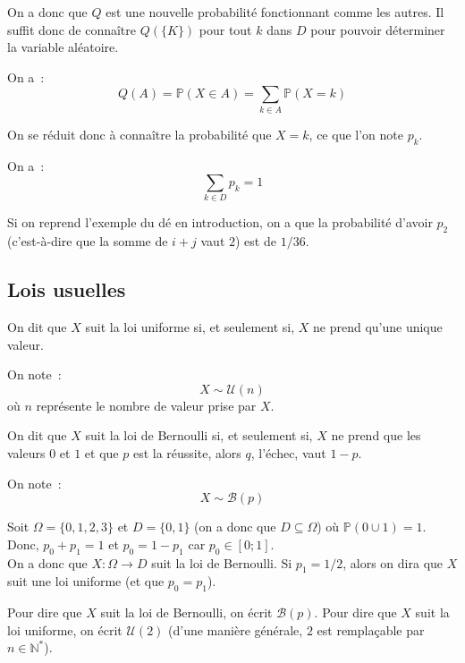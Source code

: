 \documentclass[a4paper, titlepage]{article}
\begin{document}
	On a donc que $Q$ est une nouvelle probabilité fonctionnant comme les autres.
	Il suffit donc de connaître $Q(\{K\})$ pour tout $k$ dans $D$ pour pouvoir déterminer la variable aléatoire.

	\begin{props}
		On a~:
		$$ Q(A) = \mathbb{P}(X\in A) = \sum_{k\in A} \mathbb{P}(X=k) $$
	\end{props}
	On se réduit donc à connaître la probabilité que $X=k$, ce que l'on note $p_k$.

	On a~:
	$$ \sum_{k\in D} p_k = 1 $$

	\begin{exemple}
		Si on reprend l'exemple du dé en introduction, on a que la probabilité d'avoir $p_2$ (c'est-à-dire que la somme de $i+j$ vaut $2$) est de $1/36$.
	\end{exemple}

	\subsection{Lois usuelles}
	\begin{defn}
		On dit que $X$ suit la loi uniforme si, et seulement si, $X$ ne prend qu'une unique valeur.

		On note~:
		$$ X\sim\mathcal{U}(n) $$
		où $n$ représente le nombre de valeur prise par $X$.
	\end{defn}

	\begin{defn}
		On dit que $X$ suit la loi de Bernoulli si, et seulement si, $X$ ne prend que les valeurs $0$ et $1$ et que $p$ est la réussite, alors $q$, l'échec, vaut $1-p$.

		On note~:
		$$ X\sim\mathcal{B}(p) $$
	\end{defn}

	\begin{exemple}
		Soit $\Omega = \{0, 1, 2, 3\}$ et $D = \{0, 1\}$ (on a donc que $D\subseteq \Omega$) où $\mathbb{P}(0\cup 1) = 1$.\\
		Donc, $p_0+p_1 = 1$ et $p_0 = 1- p_1$ car $p_0\in[0;1]$.\\
		On a donc que $X:\Omega \to D$ suit la loi de Bernoulli. Si $p_1 = 1/2$, alors on dira que $X$ suit une loi uniforme (et que $p_0 = p_1$).
	\end{exemple}
	Pour dire que $X$ suit la loi de Bernoulli, on écrit $\mathcal{B}(p)$.
	Pour dire que $X$ suit la loi uniforme, on écrit $\mathcal{U}(2)$ (d'une manière générale, $2$ est remplaçable par $n\in\mathbb{N}^*$).
\end{document}
